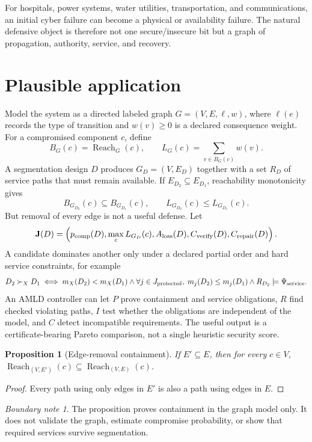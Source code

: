 \documentclass[11pt,oneside]{book}
\newtheorem{proposition}[theorem]{Proposition}
\theoremstyle{definition}
\theoremstyle{remark}
\newtheorem{boundary}[theorem]{Boundary note}
\newcommand{\Reach}{\operatorname{Reach}}
\begin{document}
For hospitals, power systems, water utilities, transportation, and communications, an initial cyber
failure can become a physical or availability failure. The natural defensive object is therefore not
one secure/insecure bit but a graph of propagation, authority, service, and recovery.

\section{Plausible application}
Model the system as a directed labeled graph \(G=(V,E,\ell,w)\), where \(\ell(e)\) records the type
of transition and \(w(v)\ge0\) is a declared consequence weight. For a compromised component
\(c\), define
\[
B_G(c)=\Reach_G(c),
\qquad
L_G(c)=\sum_{v\in B_G(c)}w(v).
\]
A segmentation design \(D\) produces \(G_D=(V,E_D)\) together with a set \(R_D\) of service
paths that must remain available. If \(E_{D_2}\subseteq E_{D_1}\), reachability monotonicity gives
\[
B_{G_{D_2}}(c)\subseteq B_{G_{D_1}}(c),
\qquad
L_{G_{D_2}}(c)\le L_{G_{D_1}}(c).
\]
But removal of every edge is not a useful defense. Let
\[
\mathbf J(D)=\left(
p_{\rm comp}(D),
\max_cL_{G_D}(c),
A_{\rm loss}(D),
C_{\rm verify}(D),
C_{\rm repair}(D)
\right).
\]
A candidate dominates another only under a declared partial order and hard service constraints,
for example
\[
D_2\succ_XD_1
\iff
m_X(D_2)<m_X(D_1)
\land
\forall j\in J_{\rm protected},\;m_j(D_2)\le m_j(D_1)
\land R_{D_2}\models\Psi_{\rm service}.
\]
An AMLD controller can let \(P\) prove containment and service obligations, \(R\) find checked
violating paths, \(I\) test whether the obligations are independent of the model, and \(C\) detect
incompatible requirements. The useful output is a certificate-bearing Pareto comparison, not a
single heuristic security score.

\begin{proposition}[Edge-removal containment]
If \(E'\subseteq E\), then for every \(c\in V\), \(\Reach_{(V,E')}(c)\subseteq\Reach_{(V,E)}(c)\).
\end{proposition}

\begin{proof}
Every path using only edges in \(E'\) is also a path using edges in \(E\).
\end{proof}

\begin{boundary}
The proposition proves containment in the graph model only. It does not validate the graph, estimate
compromise probability, or show that required services survive segmentation.
\end{boundary}
\end{document}
